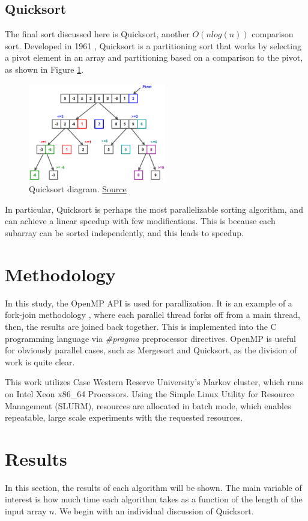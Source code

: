 \documentclass[conference]{IEEEtran}
\begin{document}
\subsection{Quicksort}
The final sort discussed here is Quicksort, another $O(n log(n))$ comparison sort. 
Developed in 1961 \cite{hoare_algorithm_1961}, Quicksort is a partitioning sort that works by selecting a pivot element in an array and partitioning based on a comparison to the pivot, as shown in Figure \ref{qck}. 
\begin{figure}[h]
	\includegraphics[width=6cm]{Quicksort.png} 
	\caption{Quicksort diagram. \href{https://www.techiedelight.com/quicksort/}{Source}}
	\label{qck}
\end{figure}
In particular, Quicksort is perhaps the most parallelizable sorting algorithm, and can achieve a linear speedup with few modifications. \cite{blelloch_programming_1996}
This is because each subarray can be sorted independently, and this leads to speedup. 
\section{Methodology}
In this study, the OpenMP \cite{openmp08} API is used for parallization. 
It is an example of a fork-join methodology	, where each parallel thread forks off from a main thread, then, the results are joined back together. 
This is implemented into the C programming language via \textit{\#pragma} preprocessor directives. 
OpenMP is useful for obviously parallel cases, such as Mergesort and Quicksort, as the division of work is quite clear. 

This work utilizes Case Western Reserve University's Markov cluster, which runs on Intel Xeon x86\_64 Processors. 
Using the Simple Linux Utility for Resource Management \cite{yoo_slurm_2003} (SLURM), resources are allocated in batch mode, which enables repeatable, large scale experiments with the requested resources. 

\section{Results}
In this section, the results of each algorithm will be shown. 
The main variable of interest is how much time each algorithm takes as a function of the length of the input array $n$. 
We begin with an individual discussion of Quicksort. 
\end{document}
